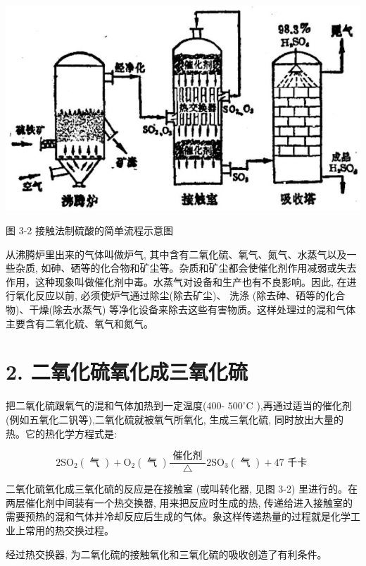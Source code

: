 \documentclass[10pt]{article}
\begin{document}
\begin{center}
\includegraphics[max width=1.0\textwidth]{images/01912d0f-097c-7e75-8f32-4f326cd86c9f_66_413784.jpg}
\end{center}

图 3-2 接触法制硫酸的简单流程示意图

从沸腾炉里出来的气体叫做炉气, 其中含有二氧化硫、氧气、氮气、水蒸气以及一些杂质, 如砷、硒等的化合物和矿尘等。杂质和矿尘都会使催化剂作用减弱或失去作用，这种现象叫做催化剂中毒。水蒸气对设备和生产也有不良影响。因此, 在进行氧化反应以前, 必须使炉气通过除尘(除去矿尘)、 洗涤 (除去砷、硒等的化合物)、干燥(除去水蒸气) 等净化设备来除去这些有害物质。这样处理过的混和气体主要含有二氧化硫、氧气和氮气。

\section*{2. 二氧化硫氧化成三氧化硫}

把二氧化硫跟氧气的混和气体加热到一定温度(400- \({500}^{ \circ }\mathrm{C}\) ),再通过适当的催化剂(例如五氧化二钒等),二氧化硫就被氧气所氧化, 生成三氧化硫, 同时放出大量的热。它的热化学方程式是:

\[
2{\mathrm{{SO}}}_{2}\left( \text{ 气 }\right) + {\mathrm{O}}_{2}\left( \text{ 气 }\right) \frac{\text{ 催化剂 }}{\bigtriangleup }2{\mathrm{{SO}}}_{3}\left( \text{ 气 }\right) + {47}\text{ 千卡 }
\]

二氧化硫氧化成三氧化硫的反应是在接触室 (或叫转化器, 见图 3-2) 里进行的。在两层催化剂中间装有一个热交换器, 用来把反应时生成的热, 传递给进入接触室的需要预热的混和气体并冷却反应后生成的气体。象这样传递热量的过程就是化学工业上常用的热交换过程。

经过热交换器, 为二氧化硫的接触氧化和三氧化硫的吸收创造了有利条件。
\end{document}
